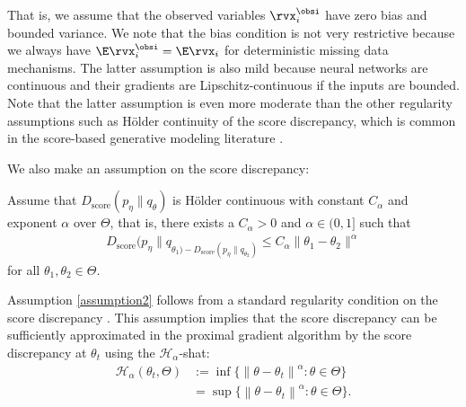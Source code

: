 That is, we assume that the observed variables $\rvx_{i}^{\obsi}$ have zero bias and bounded variance.
We note that the bias condition is not very restrictive because we always have $\E \rvx_{i}^{\obsi}=\E \rvx_{i}$ for deterministic missing data mechanisms. The latter assumption is also mild because neural networks are continuous and their gradients are Lipschitz-continuous if the inputs are bounded. Note that the latter assumption is even more moderate than the other regularity assumptions such as H\"older continuity of the score discrepancy, which is common in the score-based generative modeling literature \citep{Song2019}.

We also make an assumption on the score discrepancy:
\begin{assumption}%
	\label{assumption2}
	Assume that $D_{\text{score}}(p_{\eta} \| q_{\theta})$ is H\"older continuous with constant $C_{\alpha}$ and exponent $\alpha$ over $\Theta$, that is, there exists a $C_{\alpha} > 0$ and $\alpha \in (0, 1]$ such that
	\begin{align*}
		D_{\text{score}}(p_{\eta} \| q_{\theta_{1}) - D_{\text{score}}(p_{\eta} \| q_{\theta_{2}})} \leq C_{\alpha} \| \theta_{1} - \theta_{2} \|^{\alpha}
	\end{align*}
	for all $\theta_{1}, \theta_{2} \in \Theta$.
\end{assumption}
Assumption \ref{assumption2} follows from a standard regularity condition on the score discrepancy \citep{Song2019}. This assumption implies that the score discrepancy can be sufficiently approximated in the proximal gradient algorithm by the score discrepancy at $\theta_{t}$ using the $\mathcal{H}_{\alpha}$-shat:
\begin{align*}
	\mathcal{H}_{\alpha}(\theta_{t}, \Theta) &:= \inf \{ \left\| \theta - \theta_{t} \right\|^{\alpha} : \theta \in \Theta \} \\ 
	&= \sup \{ \left\| \theta - \theta_{t} \right\|^{\alpha} : \theta \in \Theta \}.
\end{align*}

